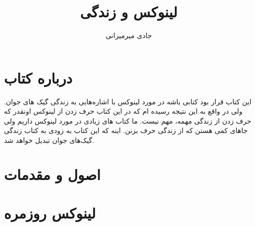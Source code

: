 \documentclass[12pt]{book}
\author{جادی میرمیرانی}
\title{لینوکس و زندگی}
\begin{document}
	\maketitle
	\tableofcontents
	\chapter*{درباره کتاب}
		این کتاب قرار بود کتابی باشه در مورد لینوکس با اشاره‌هایی به زندگی گیک های جوان.
		ولی در واقع به این نتیجه رسیده ام که در این کتاب حرف زدن از لینوکس اونقدر که حرف زدن از زندگی مهمه، مهم نیست. ما کتاب های زیادی در مورد لینوکس داریم ولی جاهای کمی هستن که از زندگی حرف بزنن. اینه که این کتاب به زودی به کتاب زندگی گیک‌های جوان تبدیل خواهد شد. 
		
	\chapter{اصول و  مقدمات}
		
		
		
		
		
	\chapter{لینوکس روزمره}
		
		
		
		
		
%		
%		
%		
%		
%		
%		
%		
%		
%		
%		
%		
%		
%		
						
\end{document}
